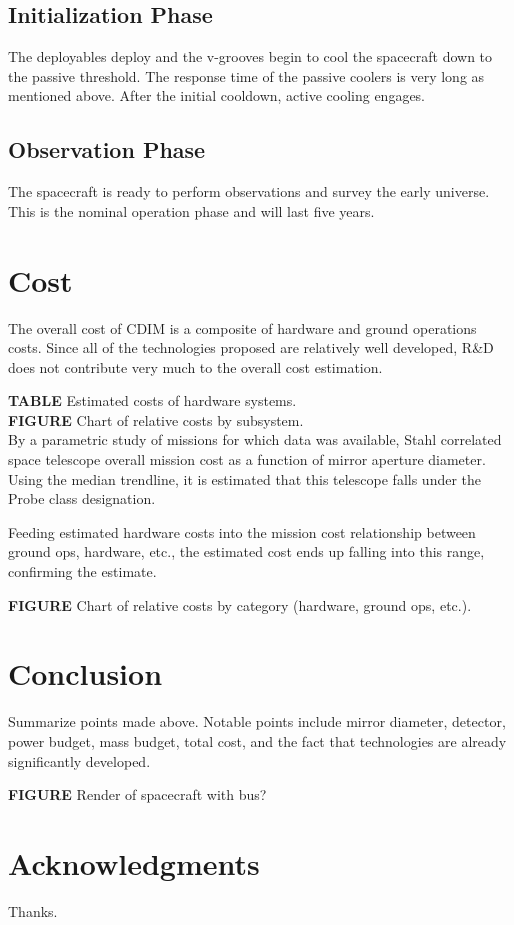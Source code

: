 \documentclass{ws-jai}
\begin{document}
\subsection{Initialization Phase}
\label{sS:initphase}
The deployables deploy and the v-grooves begin to cool the spacecraft down to the passive threshold. The response time of the passive coolers is very long as mentioned above. After the initial cooldown, active cooling engages.

\subsection{Observation Phase}
\label{sS:obsphase}
The spacecraft is ready to perform observations and survey the early universe. This is the nominal operation phase and will last five years.

\section{Cost}
\label{S:cost}
The overall cost of CDIM is a composite of hardware and ground operations costs. Since all of the technologies proposed are relatively well developed, R\&D does not contribute very much to the overall cost estimation.

\textbf{TABLE} Estimated costs of hardware systems.\\

\textbf{FIGURE} Chart of relative costs by subsystem.\\

By a parametric study of missions for which data was available, Stahl correlated space telescope overall mission cost as a function of mirror aperture diameter. Using the median trendline, it is estimated that this telescope falls under the Probe class designation.

Feeding estimated hardware costs into the mission cost relationship between ground ops, hardware, etc., the estimated cost ends up falling into this range, confirming the estimate.

\textbf{FIGURE} Chart of relative costs by category (hardware, ground ops, etc.).

\section{Conclusion}
\label{S:conclusion}
Summarize points made above. Notable points include mirror diameter, detector, power budget, mass budget, total cost, and the fact that technologies are already significantly developed.

\textbf{FIGURE} Render of spacecraft with bus?

\section*{Acknowledgments}
Thanks.


\end{document}
